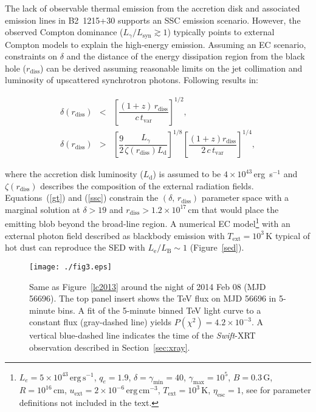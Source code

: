 \documentclass[twocolumn]{aastex6}
\def\b2{B2~1215+30}
\begin{document}
The lack of observable thermal emission from the accretion disk and associated emission lines in \b2 supports an SSC emission scenario. However, the observed Compton dominance ($L_\gamma/ L_\mathrm{syn} \gtrsim 1$) typically points to external Compton models \citep[EC;][]{1993ApJ...416..458D} to explain the high-energy emission. Assuming an EC scenario, 
constraints on $\delta$ and the distance of the energy dissipation region from the black hole ($r_\mathrm{diss}$) can be derived assuming reasonable limits on the jet collimation and  luminosity of upscattered synchrotron photons. Following \citet{nalewajko} results in:
\begin{linenomath}
\begin{eqnarray}
\delta \left(r_\mathrm{diss}\right) &<& \left[  \dfrac{\left(1+z\right)\,r_\mathrm{diss}}{c\,t_\mathrm{var}}  \right]^{1/2}, \label{gt}\\
\delta \left(r_\mathrm{diss}\right) &>& \left[ \dfrac{9}{2} \dfrac{L_\gamma}{\zeta\left(r_\mathrm{diss}\right)L_\mathrm{d}} \right]^{1/8} 
 \left[\dfrac{\left(1+z\right)r_\mathrm{diss}}{2\,c\,t_\mathrm{var}}\right]^{1/4}, \label{ssc}
\end{eqnarray}
\end{linenomath}
where the accretion disk luminosity ($L_\mathrm{d}$) is assumed to be $4 \times 10^{43}$\,erg~s$^{-1}$ \citep{2010MNRAS.402..497G} and $\zeta\left(r_\mathrm{diss}\right)$ describes the composition of the external radiation fields. Equations~(\ref{gt}) and (\ref{ssc}) constrain the $\left(\delta,\, r_\mathrm{diss}\right)$ parameter space  with a marginal solution at $\delta > 19$ and $r_\mathrm{diss} > 1.2 \times 10^{17}$\,cm that would place the emitting blob beyond the broad-line region. 
A numerical EC model\footnote{$L_e=5\times10^{43}\,\mathrm{erg}\,\mathrm{s^{-1}}$, $q_e=1.9$, $\delta = \gamma_\mathrm{min}=40$, $\gamma_\mathrm{max}=10^5$, $B=0.3\,\mathrm{G}$, $R=10^{16}\,\mathrm{cm}$, $u_\mathrm{ext}=2\times10^{-6}\,\mathrm{erg}\,\mathrm{cm^{-3}}$, $T_\mathrm{ext}=10^{3}\,\mathrm{K}$, $\eta_\mathrm{esc} =1$, see \citet{2013ApJ...768...54B} for parameter definitions not included in the text.} \citep{2013ApJ...768...54B} with an external photon field described as blackbody emission with $T_\mathrm{ext}=10^3$\,K typical of hot dust can reproduce the SED with  $L_\mathrm{e}/L_\mathrm{B} \sim 1 $ (Figure~\ref{sed}).

\begin{figure}
\centering
\texttt{[image: ./fig3.eps]}
\caption{ Same as Figure~\ref{lc2013} around the night of 2014 Feb 08 (MJD 56696). The top panel insert shows the TeV flux on MJD 56696 in 5-minute bins. A fit of the 5-minute binned TeV light curve to a constant flux (gray-dashed line) yields $P(\chi^2)=4.2 \times 10^{-3}$. A vertical blue-dashed line indicates the time of the {\it Swift}-XRT observation described in Section~\ref{sec:xray}.}
\label{5min}
\end{figure} 
\end{document}
